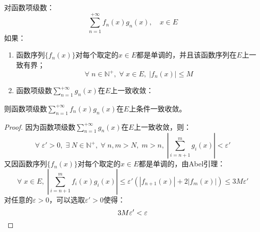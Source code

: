 \begin{theorem}[Abel判别法]
	对函数项级数：
	\begin{equation*}
		\sum_{n=1}^{+\infty}f_n(x)g_n(x),\quad x\in E
	\end{equation*}
	如果：
	\begin{enumerate}
		\item 函数序列$\{f_n(x)\}$对每个取定的$x\in E$都是单调的，并且该函数序列在$E$上一致有界；
		\begin{equation*}
			\forall\;n\in\mathbb{N}^+,\;\forall\;x\in E,\;\left|f_n(x)\right|\leqslant M
		\end{equation*}
		\item 函数项级数$\sum\limits_{n=1}^{+\infty}g_n(x)$在$E$上一致收敛：
	\end{enumerate}
	则函数项级数$\sum\limits_{n=1}^{+\infty}f_n(x)g_n(x)$在$E$上条件一致收敛。
\end{theorem}
\begin{proof}
	因为函数项级数$\sum\limits_{n=1}^{+\infty}g_n(x)$在$E$上一致收敛，则：
	\begin{equation*}
		\forall\;\varepsilon'>0,\;\exists\;N\in\mathbb{N}^+,\;\forall\;n,m>N,\;m>n,\;\left|\sum_{i=n+1}^mg_i(x)\right|<\varepsilon'
	\end{equation*}
	又因函数序列$\{f_n(x)\}$对每个取定的$x\in E$都是单调的，由Abel引理：
	\begin{equation*}
		\forall\;x\in E,\;\left|\sum_{i=n+1}^mf_i(x)g_i(x)\right|\leqslant\varepsilon'(|f_{n+1}(x)|+2|f_m(x)|)\leqslant3M\varepsilon'
	\end{equation*}
	对任意的$\varepsilon>0$，可以选取$\varepsilon'>0$使得：
	\begin{equation*}
		3M\varepsilon'<\varepsilon\qedhere
	\end{equation*}
\end{proof}













